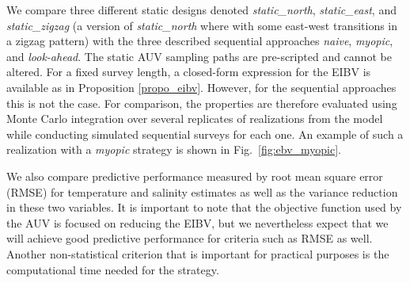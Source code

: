 \documentclass[aoas,preprint]{imsart}
\begin{document}
We compare three different static designs denoted
\textit{static\_north}, \textit{static\_east}, and
\textit{static\_zigzag} (a version of \textit{static\_north} where with some east-west transitions in a zigzag pattern) with the three described sequential approaches
\textit{naive}, \textit{myopic}, and \textit{look-ahead}. The static
AUV sampling paths are pre-scripted and cannot be altered.
For a fixed survey length, a closed-form expression for the EIBV is
available as in Proposition \ref{propo_eibv}. However, for the sequential
approaches this is not the case. For comparison, the properties are
therefore evaluated using Monte Carlo integration over several replicates
of realizations from the model while conducting simulated sequential
surveys for each one. An example of such a realization with a \textit{myopic}
strategy is shown in Fig.~\ref{fig:ebv_myopic}. 

We also compare predictive
performance measured by root mean square error (RMSE) for temperature
and salinity estimates as well as the variance reduction in these
two variables. It is important to note that the objective function
used by the AUV is focused on reducing the
EIBV, but we nevertheless expect that we will achieve good predictive
performance for criteria such as RMSE as well. Another non-statistical
criterion that is important for practical purposes is the computational
time needed for the strategy.
\end{document}
